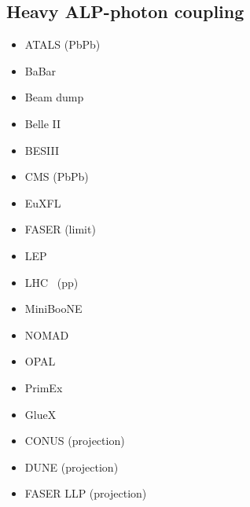 \documentclass[8pt,twocolumn]{extarticle}
\begin{document}
\begin{mdframed}
\vspace{-1em}
\section{Heavy ALP-photon coupling}\vspace{-0.5em}
\begin{itemize}\setlength\itemsep{-0.5em}
    \item ATALS (PbPb)~\cite{ATLAS:2020hii}
    \item BaBar~\cite{Dolan:2017osp}
    \item Beam dump~\cite{CHARM:1985anb,Riordan:1987aw,Dolan:2017osp,Blumlein:1990ay,NA64:2020qwq}
    \item Belle II~\cite{Belle-II:2020jti}
    \item BESIII~\cite{BESIII:2022rzz,BESIII:2024hdv}
    \item CMS (PbPb)~\cite{CMS:2018erd}
    \item EuXFL~\cite{Halliday:2024lca}
        \item FASER (limit)~\cite{FASER:2024bbl}
    \item LEP~\cite{Jaeckel:2015jla}
    \item LHC~ (pp)\cite{Knapen:2016moh}
    \item MiniBooNE~\cite{Capozzi:2023ffu}
    \item NOMAD~\cite{NOMAD:2000usb}
	 \item OPAL~\cite{Knapen:2016moh}
	 \item PrimEx~\cite{PrimEx:2010fvg,Aloni:2019ruo}
	 \item GlueX~\cite{Pybus:2023yex}
	     \item CONUS (projection)~\cite{Dent:2019ueq}
    \item DUNE (projection)~\cite{Brdar:2020dpr}
    \item FASER LLP (projection)~\cite{FASER:2018eoc}
\end{itemize}
\end{mdframed}
\end{document}
